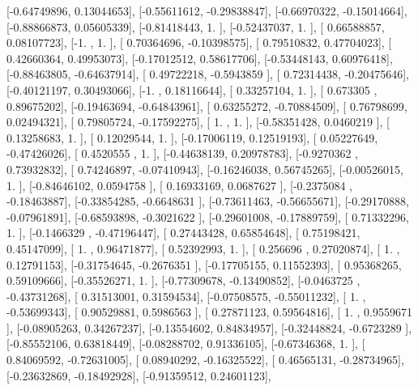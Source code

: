 \documentclass{article}
\begin{document}
       [-0.64749896,  0.13044653],
       [-0.55611612, -0.29838847],
       [-0.66970322, -0.15014664],
       [-0.88866873,  0.05605339],
       [-0.81418443,  1.        ],
       [-0.52437037,  1.        ],
       [ 0.66588857,  0.08107723],
       [-1.        ,  1.        ],
       [ 0.70364696, -0.10398575],
       [ 0.79510832,  0.47704023],
       [ 0.42660364,  0.49953073],
       [-0.17012512,  0.58617706],
       [-0.53448143,  0.60976418],
       [-0.88463805, -0.64637914],
       [ 0.49722218, -0.5943859 ],
       [ 0.72314438, -0.20475646],
       [-0.40121197,  0.30493066],
       [-1.        ,  0.18116644],
       [ 0.33257104,  1.        ],
       [ 0.673305  ,  0.89675202],
       [-0.19463694, -0.64843961],
       [ 0.63255272, -0.70884509],
       [ 0.76798699,  0.02494321],
       [ 0.79805724, -0.17592275],
       [ 1.        ,  1.        ],
       [-0.58351428,  0.0460219 ],
       [ 0.13258683,  1.        ],
       [ 0.12029544,  1.        ],
       [-0.17006119,  0.12519193],
       [ 0.05227649, -0.47426026],
       [ 0.4520555 ,  1.        ],
       [-0.44638139,  0.20978783],
       [-0.9270362 ,  0.73932832],
       [ 0.74246897, -0.07410943],
       [-0.16246038,  0.56745265],
       [-0.00526015,  1.        ],
       [-0.84646102,  0.0594758 ],
       [ 0.16933169,  0.0687627 ],
       [-0.2375084 , -0.18463887],
       [-0.33854285, -0.6648631 ],
       [-0.73611463, -0.56655671],
       [-0.29170888, -0.07961891],
       [-0.68593898, -0.3021622 ],
       [-0.29601008, -0.17889759],
       [ 0.71332296,  1.        ],
       [-0.1466329 , -0.47196447],
       [ 0.27443428,  0.65854648],
       [ 0.75198421,  0.45147099],
       [ 1.        ,  0.96471877],
       [ 0.52392993,  1.        ],
       [ 0.256696  ,  0.27020874],
       [ 1.        ,  0.12791153],
       [-0.31754645, -0.2676351 ],
       [-0.17705155,  0.11552393],
       [ 0.95368265,  0.59109666],
       [-0.35526271,  1.        ],
       [-0.77309678, -0.13490852],
       [-0.0463725 , -0.43731268],
       [ 0.31513001,  0.31594534],
       [-0.07508575, -0.55011232],
       [ 1.        , -0.53699343],
       [ 0.90529881,  0.5986563 ],
       [ 0.27871123,  0.59564816],
       [ 1.        ,  0.9559671 ],
       [-0.08905263,  0.34267237],
       [-0.13554602,  0.84834957],
       [-0.32448824, -0.6723289 ],
       [-0.85552106,  0.63818449],
       [-0.08288702,  0.91336105],
       [-0.67346368,  1.        ],
       [ 0.84069592, -0.72631005],
       [ 0.08940292, -0.16325522],
       [ 0.46565131, -0.28734965],
       [-0.23632869, -0.18492928],
       [-0.91359512,  0.24601123],
\end{document}
